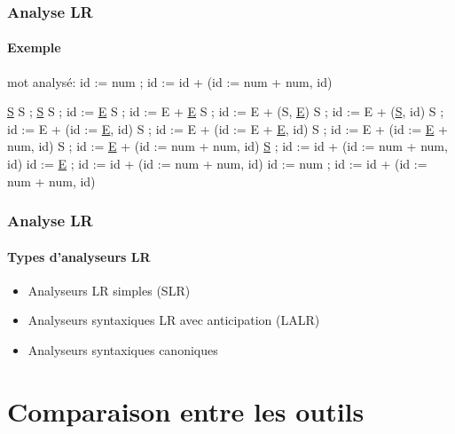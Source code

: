 \documentclass{beamer}
\begin{document}
\begin{frame}\frametitle{Analyse LR}\framesubtitle{Exemple}

	mot analysé:   id := num ; id := id + (id := num + num, id)

	\newline\newline
	\underline{S}\newline
	S ; \underline{S}\newline
	S ; id := \underline{E}\newline
	S ; id := E + \underline{E}\newline
	S ; id := E + (S, \underline{E})\newline
	S ; id := E + (\underline{S}, id)\newline
	S ; id := E + (id := \underline{E}, id)\newline
	S ; id := E + (id := E + \underline{E}, id)\newline
	S ; id := E + (id := \underline{E} + num, id)\newline
	S ; id := \underline{E} + (id := num + num, id)\newline
	\underline{S} ; id := id + (id := num + num, id)\newline
	id := \underline{E} ; id := id + (id := num + num, id)\newline
	id := num ; id := id + (id := num + num, id)\newline

\end{frame}

\begin{frame}\frametitle{Analyse LR}\framesubtitle{Types d'analyseurs LR}

	\begin{itemize}
				\item Analyseurs LR simples (SLR)\newline
				\item Analyseurs syntaxiques LR avec anticipation (LALR)\newline
				\item Analyseurs syntaxiques canoniques\newline
	\end{itemize}

\end{frame}





\section{Comparaison entre les outils}
\end{document}
